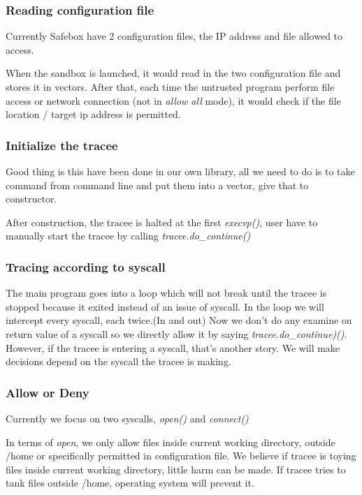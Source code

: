 \documentclass[conference,compsoc]{IEEEtran}
\begin{document}
		\subsubsection{Reading configuration file}
			Currently Safebox have 2 configuration files, the IP address and file allowed to access.
			\par
			When the sandbox is launched, it would read in the two configuration file and stores it in vectors. After that, each time the untrusted program perform file access or network connection (not in \emph{allow all} mode), it would check if the file location / target ip address is permitted.
		\subsubsection{Initialize the tracee}
			\par
				Good thing is this have been done in our own library, all we need to do is to take command from command line and put them into a vector, give that to constructor. 
			\par
				After construction, the tracee is halted at the first \emph{execvp()}, user have to manually start the tracee by calling \emph{tracee.do\_continue()}

		\subsubsection{Tracing according to syscall}
			\par
				The main program goes into a loop which will not break until the tracee is stopped because it exited instead of an issue of syscall.
				In the loop we will intercept every syscall, each twice.(In and out)
				Now we don't do any examine on return value of a syscall so we directly allow it by saying \emph{tracee.do\_continue)()}.
				However, if the tracee is entering a syscall, that's another story.
				We will make decisions depend on the syscall the tracee is making.
		\subsubsection{Allow or Deny}
			\par
				Currently we focus on two syscalls, \emph{open()} and \emph{connect()}
			\par
				In terms of \emph{open}, we only allow files inside current working directory, outside /home or specifically permitted in configuration file.
				We believe if tracee is toying files inside current working directory, little harm can be made.
				If tracee tries to tank files outside /home, operating system will prevent it.
				
\end{document}
